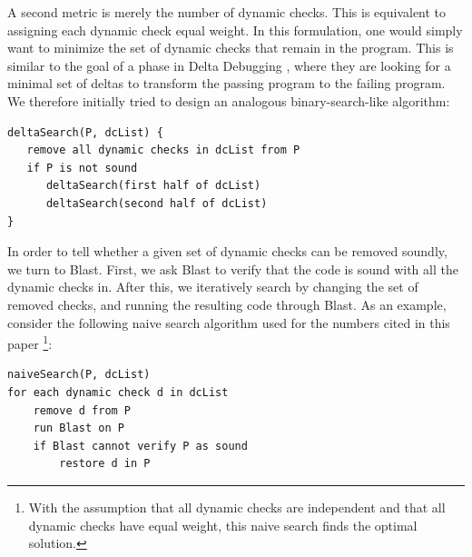 \documentclass[10pt,letterpaper,twocolumn,english]{article}
\begin{document}
A second metric is merely the number of dynamic checks.  This is
equivalent to assigning each dynamic check equal weight.  In this
formulation, one would simply want to minimize the set of dynamic checks
that remain in the program.  This is similar to the goal of a phase in
Delta Debugging \cite{deltaDebugging}, where they are looking for a
minimal set of deltas to transform the passing program to the failing
program.  We therefore initially tried to design an analogous
binary-search-like algorithm:

\begin{verbatim}
deltaSearch(P, dcList) {
   remove all dynamic checks in dcList from P
   if P is not sound
      deltaSearch(first half of dcList)
      deltaSearch(second half of dcList)
}
\end{verbatim}

 


In order to tell whether a given set of dynamic checks can be removed
soundly, we turn to Blast.  First, we ask Blast to verify that the code
is sound with all the dynamic checks in.  After this, we iteratively
search by changing the set of removed checks, and running the resulting
code through Blast.  As an example, consider the following naive search
algorithm used for the numbers cited in this paper \footnote{With the
assumption that all dynamic checks are independent and that all dynamic
checks have equal weight, this naive search finds the optimal
solution.}:

\begin{verbatim}
naiveSearch(P, dcList)
for each dynamic check d in dcList
    remove d from P
    run Blast on P
    if Blast cannot verify P as sound
        restore d in P
\end{verbatim}
\end{document}
